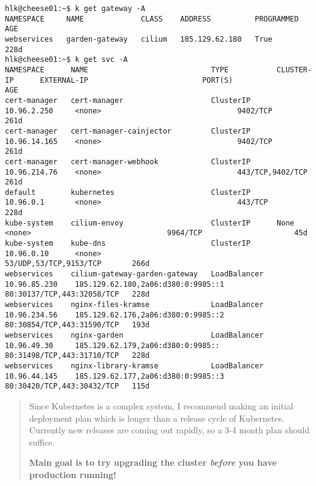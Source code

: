 \documentclass[Screen16to9,17pt]{foils}
\begin{document}
\begin{verbatim}
hlk@cheese01:~$ k get gateway -A
NAMESPACE     NAME             CLASS    ADDRESS          PROGRAMMED   AGE
webservices   garden-gateway   cilium   185.129.62.180   True         228d
hlk@cheese01:~$ k get svc -A
NAMESPACE      NAME                            TYPE           CLUSTER-IP      EXTERNAL-IP                          PORT(S)                      AGE
cert-manager   cert-manager                    ClusterIP      10.96.2.250     <none>                               9402/TCP                     261d
cert-manager   cert-manager-cainjector         ClusterIP      10.96.14.165    <none>                               9402/TCP                     261d
cert-manager   cert-manager-webhook            ClusterIP      10.96.214.76    <none>                               443/TCP,9402/TCP             261d
default        kubernetes                      ClusterIP      10.96.0.1       <none>                               443/TCP                      228d
kube-system    cilium-envoy                    ClusterIP      None            <none>                               9964/TCP                     45d
kube-system    kube-dns                        ClusterIP      10.96.0.10      <none>                               53/UDP,53/TCP,9153/TCP       266d
webservices    cilium-gateway-garden-gateway   LoadBalancer   10.96.85.230    185.129.62.180,2a06:d380:0:9985::1   80:30137/TCP,443:32058/TCP   228d
webservices    nginx-files-kramse              LoadBalancer   10.96.234.56    185.129.62.176,2a06:d380:0:9985::2   80:30854/TCP,443:31590/TCP   193d
webservices    nginx-garden                    LoadBalancer   10.96.49.30     185.129.62.179,2a06:d380:0:9985::    80:31498/TCP,443:31710/TCP   228d
webservices    nginx-library-kramse            LoadBalancer   10.96.44.145    185.129.62.177,2a06:d380:0:9985::3   80:30420/TCP,443:30432/TCP   115d

\end{verbatim}









\begin{quote}
Since Kubernetes is a complex system, I recommend making an initial deployment plan which is longer than a release cycle of Kubernetes. Currently new releases are coming out rapidly, so a 3-4 month plan should suffice.

{\bf Main goal is to try upgrading the cluster \emph{before} you have production running!}
\end{quote}
\end{document}

